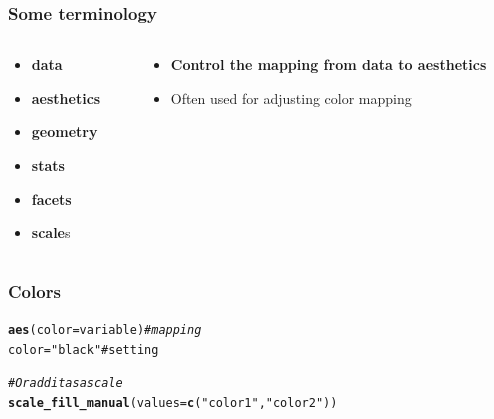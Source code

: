 \documentclass{beamer}\usepackage[]{graphicx}\usepackage[]{color}
\makeatletter
\newcommand{\hlstr}[1]{\textcolor[rgb]{0.192,0.494,0.8}{#1}}%
\newcommand{\hlcom}[1]{\textcolor[rgb]{0.678,0.584,0.686}{\textit{#1}}}%
\newcommand{\hlkwd}[1]{\textcolor[rgb]{0.737,0.353,0.396}{\textbf{#1}}}%
\newenvironment{kframe}{%
 \def\at@end@of@kframe{}%
 \ifinner\ifhmode%
  \def\at@end@of@kframe{\end{minipage}}%
  \begin{minipage}{\columnwidth}%
 \fi\fi%
 \def\FrameCommand##1{\hskip\@totalleftmargin \hskip-\fboxsep
 \colorbox{shadecolor}{##1}\hskip-\fboxsep
     \hskip-\linewidth \hskip-\@totalleftmargin \hskip\columnwidth}%
 \MakeFramed {\advance\hsize-\width
   \@totalleftmargin\z@ \linewidth\hsize
   \@setminipage}}%
 {\par\unskip\endMakeFramed%
 \at@end@of@kframe}
\newenvironment{knitrout}{}{} %
\makeatother
\begin{document}


\begin{frame}[fragile]
\frametitle{Some terminology}
\begin{columns}[t]

\begin{column}[T]{3cm}
\begin{itemize}
    \item \textbf{\color{gray}data}
    \item \textbf{\color{gray}aesthetics}
    \item \textbf{\color{gray}geometry}
    \item \textbf{\color{gray}stats}
    \item \textbf{\color{gray}facets}
    \item \textbf{scale}s
\end{itemize}
\end{column}

\begin{column}[T]{8cm}
\begin{itemize}
    \item \textbf{Control the mapping from data to aesthetics}
    \item Often used for adjusting color mapping
\end{itemize}
\end{column}

\end{columns}
\end{frame}


\begin{frame}[fragile]
\frametitle{Colors}
\begin{knitrout}\footnotesize
{}\color{fgcolor}\begin{kframe}
\begin{alltt}
\hlkwd{aes}(color = variable)  \hlcom{# mapping}
color = \hlstr{"black"}  # setting

\hlcom{# Or add it as a scale}
\hlkwd{scale_fill_manual}(values = \hlkwd{c}(\hlstr{"color1"}, \hlstr{"color2"}))
\end{alltt}
\end{kframe}
\end{knitrout}

\end{frame}
\end{document}
